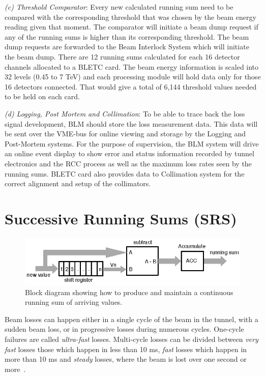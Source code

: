 \documentclass{llncs}
\begin{document}
\emph{(c) Threshold Comparator}: Every new calculated running sum need to be compared with the corresponding threshold that was chosen by the beam energy reading given that moment. The comparator will initiate a beam dump request if any of the running sums is higher than its corresponding threshold. The beam dump requests are forwarded to the Beam Interlock System which will initiate the beam dump. There are 12 running sums calculated for each 16 detector channels allocated to a BLETC card. The beam energy information is scaled into 32 levels (0.45 to 7 TeV) and each processing module will hold data only for those 16 detectors connected. That would give a total of 6,144 threshold values needed to be held on each card.

\emph{(d) Logging, Post Mortem and Collimation}:  To be able to trace back the loss signal development, BLM should store the loss measurement data. This data will be sent over the VME-bus for online viewing and storage by the Logging and Post-Mortem systems. For the purpose of supervision, the BLM system will drive an online event display to show error and status information recorded by tunnel electronics and the RCC process as well as the maximum loss rates seen by the running sums. BLETC card also provides data to Collimation system for the correct alignment and setup of the collimators.



\section{Successive Running Sums (SRS)}
\label{sec-SRS}

\begin{figure}[t]
  \centering \includegraphics{rs.eps}
   \caption{Block diagram showing how to produce and maintain a continuous running sum of arriving values.}
  \label{fig:RS-basic}
\end{figure}

Beam losses can happen either in a single cycle of the beam in the tunnel, with a sudden beam loss, or in progressive losses during numerous cycles. One-cycle failures are called \emph{ultra-fast} losses. Multi-cycle losses can be divided between \emph{very fast} losses those which happen in less than 10 ms, \emph{fast} losses which happen in more than 10 ms and \emph{steady} losses, where the beam is lost over one second or more~\cite{Schmidt-ICFA}.
\end{document}
